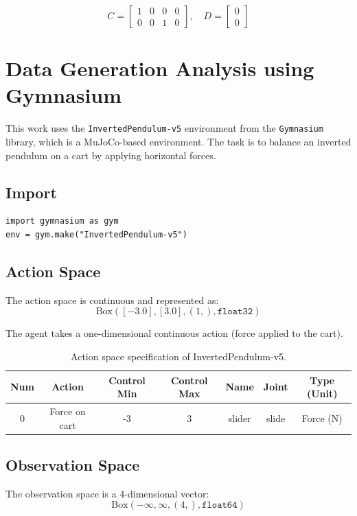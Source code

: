 \documentclass[12pt]{article}
\begin{document}
\begin{equation}
C =
\begin{bmatrix}
1 & 0 & 0 & 0 \\
0 & 0 & 1 & 0
\end{bmatrix}, \quad
D =
\begin{bmatrix}
0 \\ 0
\end{bmatrix}
\end{equation}


\section{Data Generation Analysis using Gymnasium}

This work uses the \texttt{InvertedPendulum-v5} environment from the \texttt{Gymnasium} library, which is a MuJoCo-based environment. The task is to balance an inverted pendulum on a cart by applying horizontal forces.

\subsection{Import}
\begin{verbatim}
import gymnasium as gym
env = gym.make("InvertedPendulum-v5")
\end{verbatim}

\subsection{Action Space}
The action space is continuous and represented as:
\[
\text{Box}([-3.0], [3.0], (1,), \texttt{float32})
\]

The agent takes a one-dimensional continuous action (force applied to the cart).  

\begin{table}[h!]
\centering
\begin{tabular}{|c|c|c|c|c|c|c|}
\hline
Num & Action & Control Min & Control Max & Name & Joint & Type (Unit) \\
\hline
0 & Force on cart & -3 & 3 & slider & slide & Force (N) \\
\hline
\end{tabular}
\caption{Action space specification of InvertedPendulum-v5.}
\end{table}

\subsection{Observation Space}
The observation space is a 4-dimensional vector:
\[
\text{Box}(-\infty, \infty, (4,), \texttt{float64})
\]
\end{document}
